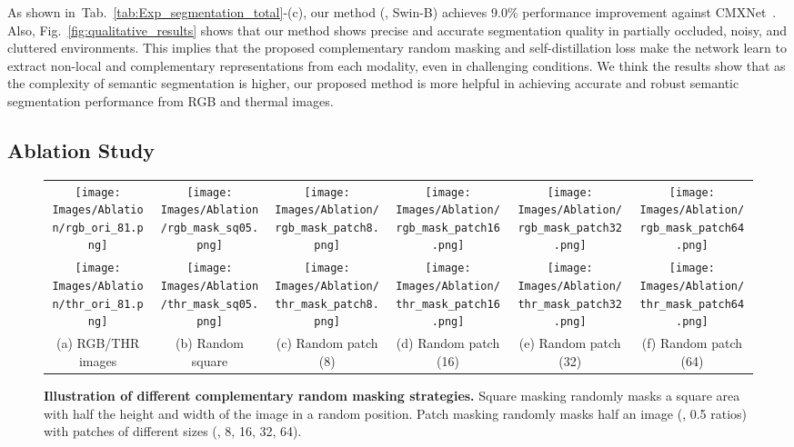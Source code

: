 \documentclass[10pt,twocolumn,letterpaper]{article}
\newcommand{\figref}[1]{Fig.~\ref{#1}}
\newcommand{\tabref}[1]{Tab.~\ref{#1}}
\begin{document}
As shown in~\tabref{tab:Exp_segmentation_total}-(c), our method (\ie, Swin-B) achieves 9.0\% performance improvement against CMXNet~\cite{liu2022cmx}.
Also, \figref{fig:qualitative_results} shows that our method shows precise and accurate segmentation quality in partially occluded, noisy, and cluttered environments.
This implies that the proposed complementary random masking and self-distillation loss make the network learn to extract non-local and complementary representations from each modality, even in challenging conditions. 
We think the results show that as the complexity of semantic segmentation is higher, our proposed method is more helpful in achieving accurate and robust semantic segmentation performance from RGB and thermal images.












%
 \subsection{Ablation Study}
\label{sec:ablation_study}
\begin{figure*}[t]
\begin{center}
{
\begin{tabular}{c@{\hskip 0.005\linewidth}c@{\hskip 0.005\linewidth}c@{\hskip 0.005\linewidth}c@{\hskip 0.005\linewidth}c@{\hskip 0.005\linewidth}c}
\texttt{[image: Images/Ablation/rgb\_ori\_81.png]} &
\texttt{[image: Images/Ablation/rgb\_mask\_sq05.png]} &
\texttt{[image: Images/Ablation/rgb\_mask\_patch8.png]} &
\texttt{[image: Images/Ablation/rgb\_mask\_patch16.png]} &
\texttt{[image: Images/Ablation/rgb\_mask\_patch32.png]} &
\texttt{[image: Images/Ablation/rgb\_mask\_patch64.png]} \\
\texttt{[image: Images/Ablation/thr\_ori\_81.png]} &
\texttt{[image: Images/Ablation/thr\_mask\_sq05.png]} &
\texttt{[image: Images/Ablation/thr\_mask\_patch8.png]} &
\texttt{[image: Images/Ablation/thr\_mask\_patch16.png]} &
\texttt{[image: Images/Ablation/thr\_mask\_patch32.png]} &
\texttt{[image: Images/Ablation/thr\_mask\_patch64.png]} \\
{\footnotesize (a) RGB/THR images} & {\footnotesize (b) Random square } & {\footnotesize (c) Random patch (8)} & {\footnotesize (d) Random patch (16)} & {\footnotesize (e) Random patch (32)} & {\footnotesize (f) Random patch (64)} \\
\end{tabular}

}
\end{center}
\caption{{\bf Illustration of different complementary random masking strategies.} 
Square masking randomly masks a square area with half the height and width of the image in a random position.
Patch masking randomly masks half an image (\ie, 0.5 ratios) with patches of different sizes (\eg, 8, 16, 32, 64).
}
\label{fig:ablation}
\end{figure*}
 
\end{document}
